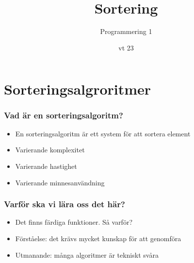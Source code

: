 \documentclass[aspectratio=169]{beamer}
\begin{document}


\title{Sortering}
\date{vt 23}
\author{Programmering 1}

\maketitle

\section{Sorteringsalgroritmer}

\begin{frame}
	\frametitle{Vad är en sorteringsalgoritm?}
	
	\begin{itemize}
		\item En sorteringsalgoritm är ett system för att sortera element
		\item Varierande komplexitet
		\item Varierande hastighet
		\item Varierande minnesanvändning
	\end{itemize}
	
\end{frame}

\begin{frame}
	\frametitle{Varför ska vi lära oss det här?}
	
	\begin{itemize}
		\item Det finns färdiga funktioner. Så varför?
		\pause
		\item Förståelse: det krävs mycket kunskap för att genomföra
		\item Utmanande: många algoritmer är tekniskt svåra
	\end{itemize}
	
\end{frame}
\end{document}

